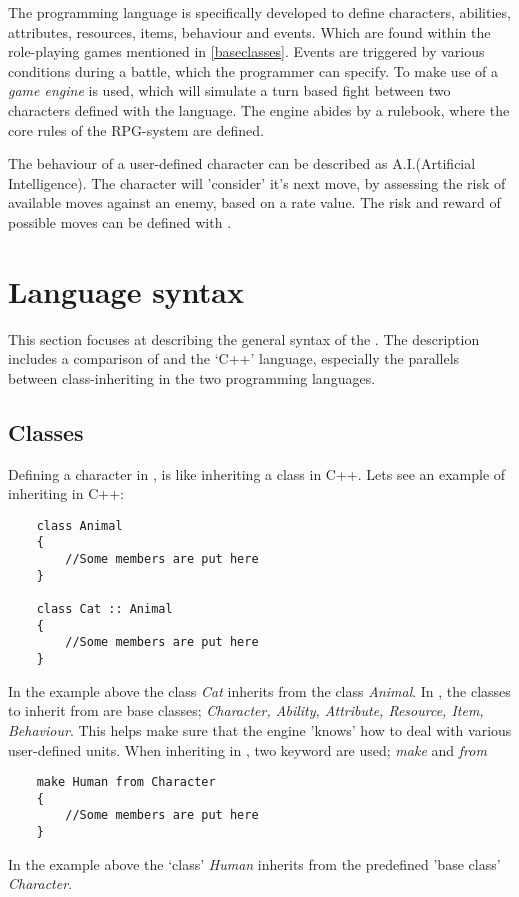 The programming language \langname{} is specifically developed to define characters, abilities, attributes, resources, items, behaviour and events. Which are found within the role-playing games mentioned in \vref{baseclasses}. Events are triggered by various conditions during a battle, which the programmer can specify.
To make use of \langname{} a \emph{game engine} is used, which will simulate a turn based fight between two characters defined with the language. The engine abides by a rulebook, where the core rules of the RPG-system are defined. 

The behaviour of a user-defined character can be described as A.I.(Artificial Intelligence). The character will 'consider' it's next move, by assessing the risk of available moves against an enemy, based on a rate value. The risk and reward of possible moves can be defined with \langname{}.

\section{Language syntax}
This section focuses at describing the general syntax of the \langname{}. The description includes a comparison of \langname{} and the `C++' language, especially the parallels between class-inheriting in the two programming languages. 

\subsection{Classes}
Defining a character in \langname{}, is like inheriting a class in C++.
Lets see an example of inheriting in C++:
\begin{lstlisting}
	class Animal
	{
		//Some members are put here
	}
	
	class Cat :: Animal
	{
		//Some members are put here
	}
\end{lstlisting}
In the example above the class \emph{Cat} inherits from the class \emph{Animal}. In \langname{}, the classes to inherit from are base classes; \emph{Character, Ability, Attribute, Resource, Item, Behaviour}. This helps make sure that the engine 'knows' how to deal with various user-defined units.
When inheriting in \langname{}, two keyword are used; \emph{make} and \emph{from}
\begin{lstlisting}
	make Human from Character
	{
		//Some members are put here
	}
\end{lstlisting}
In the example above the `class' \emph{Human} inherits from the predefined 'base class' \emph{Character}.


